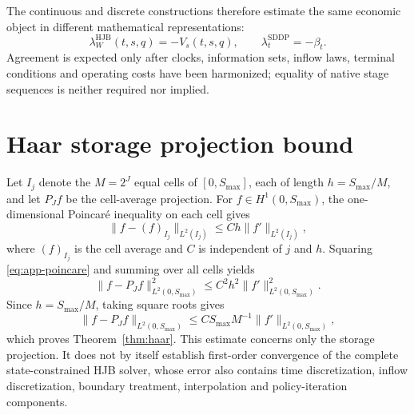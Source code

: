 \documentclass[11pt,a4paper]{article}
\begin{document}
The continuous and discrete constructions therefore estimate the same economic
object in different mathematical representations:
\begin{equation}
 \lambda_W^{\mathrm{HJB}}(t,s,q)=-V_s(t,s,q),\qquad
 \lambda_{t}^{\mathrm{SDDP}}=-\beta_t.
 \label{eq:app-bridge}
\end{equation}
Agreement is expected only after clocks, information sets, inflow laws, terminal
conditions and operating costs have been harmonized; equality of native stage
sequences is neither required nor implied.

\section{Haar storage projection bound}
\label{app:haar}
Let $I_j$ denote the $M=2^J$ equal cells of $[0,S_{\max}]$, each of length
$h=S_{\max}/M$, and let $P_Jf$ be the cell-average projection. For
$f\in H^1(0,S_{\max})$, the one-dimensional Poincar\'e inequality on each cell gives
\begin{equation}
 \|f-(f)_{I_j}\|_{L^2(I_j)}\le C h\|f'\|_{L^2(I_j)},
 \label{eq:app-poincare}
\end{equation}
where $(f)_{I_j}$ is the cell average and $C$ is independent of $j$ and $h$.
Squaring \eqref{eq:app-poincare} and summing over all cells yields
\begin{equation}
 \|f-P_Jf\|_{L^2(0,S_{\max})}^2
 \le C^2h^2\|f'\|_{L^2(0,S_{\max})}^2.
 \label{eq:app-haar-squared}
\end{equation}
Since $h=S_{\max}/M$, taking square roots gives
\begin{equation}
 \|f-P_Jf\|_{L^2(0,S_{\max})}
 \le C S_{\max}M^{-1}\|f'\|_{L^2(0,S_{\max})},
\end{equation}
which proves Theorem~\ref{thm:haar}. This estimate concerns only the storage
projection. It does not by itself establish first-order convergence of the complete
state-constrained HJB solver, whose error also contains time discretization, inflow
discretization, boundary treatment, interpolation and policy-iteration components.
\end{document}
